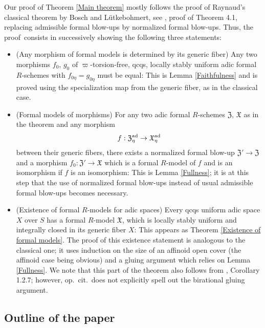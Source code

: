 \documentclass[12pt,twoside,a4paper]{article}
\theoremstyle{definition}
\theoremstyle{remark}
\newcommand\ad{{\rm ad}}
\begin{document}
Our proof of Theorem \ref{Main theorem} mostly follows the proof of Raynaud's classical theorem by Bosch and Lütkebohmert, see \cite{BL1}, proof of Theorem 4.1, replacing admissible formal blow-ups by normalized formal blow-ups. Thus, the proof consists in successively showing the following three statements: \begin{itemize}\item (Any morphism of formal models is determined by its generic fiber) Any two morphisms $f_{0}$, $g_{0}$ of $\varpi$-torsion-free, qcqs, locally stably uniform adic formal $R$-schemes with $f_{0\eta}=g_{0\eta}$ must be equal: This is Lemma \ref{Faithfulness} and is proved using the specialization map from the generic fiber, as in the classical case.
\item (Formal models of morphisms) For any two adic formal $R$-schemes $\mathfrak{Z}$, $\mathfrak{X}$ as in the theorem and any morphism \begin{equation*}f: \mathfrak{Z}_{\eta}^{\ad}\to \mathfrak{X}_{\eta}^{\ad}\end{equation*}between their generic fibers, there exists a normalized formal blow-up $\mathfrak{Z}'\to\mathfrak{Z}$ and a morphism $f_{0}: \mathfrak{Z}'\to\mathfrak{X}$ which is a formal $R$-model of $f$ and is an isomorphism if $f$ is an isomorphism: This is Lemma \ref{Fullness}; it is at this step that the use of normalized formal blow-ups instead of usual admissible formal blow-ups becomes necessary. \item (Existence of formal $R$-models for adic spaces) Every qcqs uniform adic space $X$ over $S$ has a formal $R$-model $\mathfrak{X}$, which is locally stably uniform and integrally closed in its generic fiber $X$: This appears as Theorem \ref{Existence of formal models}. The proof of this existence statement is analogous to the classical one; it uses induction on the size of an affinoid open cover (the affinoid case being obvious) and a gluing argument which relies on Lemma \ref{Fullness}. We note that this part of the theorem also follows from \cite{AGV}, Corollary 1.2.7; however, op.~cit.~does not explicitly spell out the birational gluing argument. \end{itemize}

\subsection{Outline of the paper}
\end{document}
